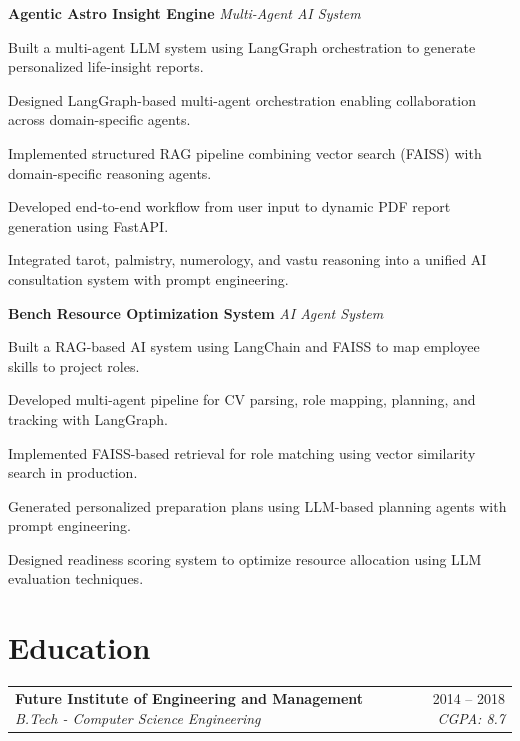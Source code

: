 \documentclass[10pt, letterpaper]{article}
\makeatletter
\newcommand{\resumeitem}[1]{\item\small{#1}}
\newcommand{\jobheading}[4]{%
  \noindent
  \begin{tabularx}{\textwidth}{@{}X r@{}}
    \textbf{\color{primary}#1} \textbar{} \textit{\small\color{subtle}#2} &
    \small\color{subtle}#3 \textbar{} \textit{\small #4}
  \end{tabularx}%
}
\makeatother
\begin{document}
\noindent\textbf{Agentic Astro Insight Engine} \textemdash{} \textit{Multi-Agent AI System}

\begin{projectitems}
\resumeitem{Built a multi-agent LLM system using LangGraph orchestration to generate personalized life-insight reports.}
\resumeitem{Designed LangGraph-based multi-agent orchestration enabling collaboration across domain-specific agents.}
\resumeitem{Implemented structured RAG pipeline combining vector search (FAISS) with domain-specific reasoning agents.}
\resumeitem{Developed end-to-end workflow from user input to dynamic PDF report generation using FastAPI.}
\resumeitem{Integrated tarot, palmistry, numerology, and vastu reasoning into a unified AI consultation system with prompt engineering.}
\end{projectitems}

\noindent\textbf{Bench Resource Optimization System} \textemdash{} \textit{AI Agent System}

\begin{projectitems}
\resumeitem{Built a RAG-based AI system using LangChain and FAISS to map employee skills to project roles.}
\resumeitem{Developed multi-agent pipeline for CV parsing, role mapping, planning, and tracking with LangGraph.}
\resumeitem{Implemented FAISS-based retrieval for role matching using vector similarity search in production.}
\resumeitem{Generated personalized preparation plans using LLM-based planning agents with prompt engineering.}
\resumeitem{Designed readiness scoring system to optimize resource allocation using LLM evaluation techniques.}
\end{projectitems}

\section{Education}

\jobheading{Future Institute of Engineering and Management}{B.Tech - Computer Science Engineering}{2014 -- 2018}{CGPA: 8.7}
\end{document}
